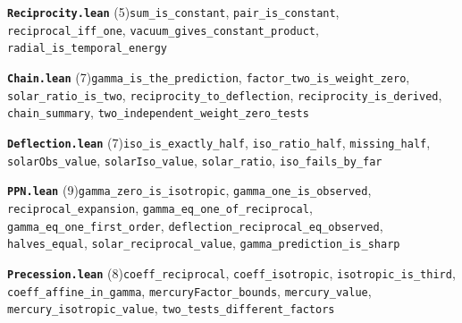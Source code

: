 \documentclass[11pt,a4paper]{article}
\theoremstyle{sudef}
\begin{document}
\noindent\textbf{\texttt{Reciprocity.lean}} (5)\quad \texttt{sum\_\allowbreak is\_\allowbreak constant}, \texttt{pair\_\allowbreak is\_\allowbreak constant}, \texttt{reciprocal\_\allowbreak iff\_\allowbreak one}, \texttt{vacuum\_\allowbreak gives\_\allowbreak constant\_\allowbreak product}, \texttt{radial\_\allowbreak is\_\allowbreak temporal\_\allowbreak energy}\par\smallskip
\noindent\textbf{\texttt{Chain.lean}} (7)\quad \texttt{gamma\_\allowbreak is\_\allowbreak the\_\allowbreak prediction}, \texttt{factor\_\allowbreak two\_\allowbreak is\_\allowbreak weight\_\allowbreak zero}, \texttt{solar\_\allowbreak ratio\_\allowbreak is\_\allowbreak two}, \texttt{reciprocity\_\allowbreak to\_\allowbreak deflection}, \texttt{reciprocity\_\allowbreak is\_\allowbreak derived}, \texttt{chain\_\allowbreak summary}, \texttt{two\_\allowbreak independent\_\allowbreak weight\_\allowbreak zero\_\allowbreak tests}\par\smallskip
\noindent\textbf{\texttt{Deflection.lean}} (7)\quad \texttt{iso\_\allowbreak is\_\allowbreak exactly\_\allowbreak half}, \texttt{iso\_\allowbreak ratio\_\allowbreak half}, \texttt{missing\_\allowbreak half}, \texttt{solarObs\_\allowbreak value}, \texttt{solarIso\_\allowbreak value}, \texttt{solar\_\allowbreak ratio}, \texttt{iso\_\allowbreak fails\_\allowbreak by\_\allowbreak far}\par\smallskip
\noindent\textbf{\texttt{PPN.lean}} (9)\quad \texttt{gamma\_\allowbreak zero\_\allowbreak is\_\allowbreak isotropic}, \texttt{gamma\_\allowbreak one\_\allowbreak is\_\allowbreak observed}, \texttt{reciprocal\_\allowbreak expansion}, \texttt{gamma\_\allowbreak eq\_\allowbreak one\_\allowbreak of\_\allowbreak reciprocal}, \texttt{gamma\_\allowbreak eq\_\allowbreak one\_\allowbreak first\_\allowbreak order}, \texttt{deflection\_\allowbreak reciprocal\_\allowbreak eq\_\allowbreak observed}, \texttt{halves\_\allowbreak equal}, \texttt{solar\_\allowbreak reciprocal\_\allowbreak value}, \texttt{gamma\_\allowbreak prediction\_\allowbreak is\_\allowbreak sharp}\par\smallskip
\noindent\textbf{\texttt{Precession.lean}} (8)\quad \texttt{coeff\_\allowbreak reciprocal}, \texttt{coeff\_\allowbreak isotropic}, \texttt{isotropic\_\allowbreak is\_\allowbreak third}, \texttt{coeff\_\allowbreak affine\_\allowbreak in\_\allowbreak gamma}, \texttt{mercuryFactor\_\allowbreak bounds}, \texttt{mercury\_\allowbreak value}, \texttt{mercury\_\allowbreak isotropic\_\allowbreak value}, \texttt{two\_\allowbreak tests\_\allowbreak different\_\allowbreak factors}\par\smallskip
\end{document}
